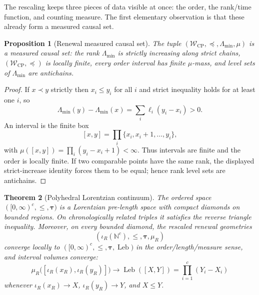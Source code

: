 \documentclass[11pt]{article}
\newtheorem{theorem}{Theorem}[section]
\newtheorem{proposition}[theorem]{Proposition}
\theoremstyle{definition}
\theoremstyle{remark}
\newcommand{\N}{\mathbb{N}}
\newcommand{\W}{\mathcal{W}}
\newcommand{\CP}{\mathrm{CP}}
\newcommand{\Lam}{\Lambda}
\newcommand{\Leb}{\operatorname{Leb}}
\newcommand{\taug}{\boldsymbol{\tau}}
\begin{document}
The rescaling keeps three pieces of data visible at once: the order, the
rank/time function, and counting measure.  The first elementary observation is
that these already form a measured causal set.

\begin{proposition}[Renewal measured causal set]
\label{prop:measured-causet}
The tuple $(\W_{\CP},\preceq,\Lam_{\min},\mu)$ is a measured causal set: the rank $\Lam_{\min}$ is strictly increasing along strict chains, $(\W_{\CP},\preceq)$ is locally finite, every order interval has finite $\mu$-mass, and level sets of $\Lam_{\min}$ are antichains.
\end{proposition}

\begin{proof}
If $x\prec y$ strictly then $x_i\le y_i$ for all $i$ and strict inequality holds for at least one $i$, so
\[
  \Lam_{\min}(y)-\Lam_{\min}(x)=\sum_i\ell_i(y_i-x_i)>0.
\]
An interval is the finite box
\[
  [x,y]=\prod_i\{x_i,x_i+1,\dots,y_i\},
\]
with $\mu([x,y])=\prod_i(y_i-x_i+1)<\infty$.  Thus intervals are finite and the order is locally finite.  If two comparable points have the same rank, the displayed strict-increase identity forces them to be equal; hence rank level sets are antichains.
\end{proof}

\begin{theorem}[Polyhedral Lorentzian continuum]
\label{thm:taxicab-limit}
The ordered space $([0,\infty)^c,\le,\taug)$ is a Lorentzian pre-length space with compact diamonds on bounded regions.  On chronologically related triples it satisfies the reverse triangle inequality.  Moreover, on every bounded diamond, the rescaled renewal geometries
\[
  (\iota_R(\N^c),\le,\taug,\mu_R)
\]
converge locally to $([0,\infty)^c,\le,\taug,\Leb)$ in the order/length/measure sense, and interval volumes converge:
\[
  \mu_R\bigl([\iota_R(x_R),\iota_R(y_R)]\bigr)
  \longrightarrow
  \Leb([X,Y])=
  \prod_{i=1}^c(Y_i-X_i)
\]
whenever $\iota_R(x_R)\to X$, $\iota_R(y_R)\to Y$, and $X\le Y$.
\end{theorem}
\end{document}
